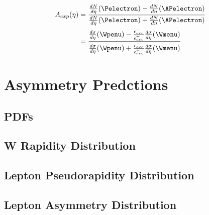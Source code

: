 \begin{align} 
A_{exp}(\eta) &= \frac{ \frac{dN}{d\eta}(\Pelectron) -
\frac{dN}{d\eta}(\APelectron) }{ \frac{dN}{d\eta}(\Pelectron) +
\frac{dN}{d\eta}(\APelectron) }\\   
              &= \frac{ \frac{d\sigma}{d\eta}(\Wpenu) -
\frac{\epsilon^{-}_{acc}}{\epsilon^{+}_{acc}} \frac{d\sigma}{d\eta}(\Wmenu) }{
\frac{d\sigma}{d\eta}(\Wpenu) + \frac{\epsilon^{-}_{acc}}{\epsilon^{+}_{acc}}
\frac{d\sigma}{d\eta}(\Wmenu) }
\label{eq:AsymExpCorr}
\end{align}


\section{Asymmetry Predctions}

\subsection{\acp{PDF}}

\subsection{W Rapidity Distribution}

\subsection{Lepton Pseudorapidity Distribution}

\subsection{Lepton Asymmetry Distribution}




